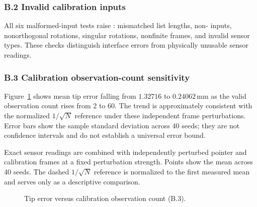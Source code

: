 \documentclass[11pt]{article}
\begin{document}
\subsubsection*{B.2 Invalid calibration inputs}
All six malformed-input tests raise : mismatched list lengths,
non- inputs, nonorthogonal rotations, singular rotations,
nonfinite frames, and invalid sensor types.  These checks distinguish
interface errors from physically unusable sensor readings.

\subsubsection*{B.3 Calibration observation-count sensitivity}
Figure~\ref{fig:validation-calibration-count} shows mean tip error falling from
$1.32716$ to $0.24062\,\mathrm{mm}$ as the valid observation count rises from
2 to 60.  The trend is approximately consistent with the normalized
$1/\sqrt N$ reference under these independent frame perturbations.  Error
bars show the sample standard deviation across 40 seeds; they are not
confidence intervals and do not establish a universal error bound.

Exact sensor readings are combined with independently perturbed pointer and
calibration frames at a fixed perturbation strength.  Points show the mean
across 40 seeds.  The dashed $1/\sqrt N$ reference is normalized to the first
measured mean and serves only as a descriptive comparison.

\begin{figure}[H]
\centering
{}
\caption{Tip error versus calibration observation count (B.3).}
\label{fig:validation-calibration-count}
\end{figure}
\end{document}
